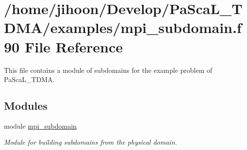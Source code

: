 \hypertarget{mpi__subdomain_8f90}{}\section{/home/jihoon/\+Develop/\+Pa\+Sca\+L\+\_\+\+T\+D\+M\+A/examples/mpi\+\_\+subdomain.f90 File Reference}
\label{mpi__subdomain_8f90}


This file contains a module of subdomains for the example problem of Pa\+Sca\+L\+\_\+\+T\+D\+MA.  


\subsection*{Modules}
\begin{DoxyCompactItemize}
\item 
module \hyperlink{namespacempi__subdomain}{mpi\+\_\+subdomain}
\begin{DoxyCompactList}\small\item\em Module for building subdomains from the physical domain. \end{DoxyCompactList}\end{DoxyCompactItemize}

